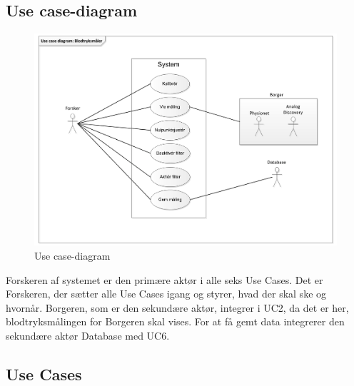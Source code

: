 \subsection{Use case-diagram}
\begin{figure}[H]
	\centering
	\includegraphics[width=1\textwidth]{Figurer/Snip20151008_30}
	\caption{Use case-diagram}
	\label{fig:Use case-diagram}
\end{figure}

Forskeren af systemet er den primære aktør i alle seks Use Cases. Det er Forskeren, der sætter alle Use Cases igang og styrer, hvad der skal ske og hvornår. Borgeren, som er den sekundære aktør, integrer i UC2, da det er her, blodtryksmålingen for Borgeren skal vises. For at få gemt data integrerer den sekundære aktør Database med UC6.  

\subsection{Use Cases}

